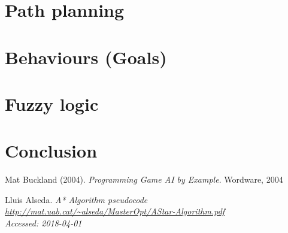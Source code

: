 \documentclass[11pt]{article}
\begin{document}
    \section{Path planning}\label{sec:pathPlanning}
    

    \newpage
    \section{Behaviours (Goals)}\label{sec:behaviour}
    
    
    \newpage
    \section{Fuzzy logic}\label{sec:fuzzyLogic}

    \newpage
    \section{Conclusion}\label{sec:conclusion}
    
    
    \newpage

    \begin{thebibliography}{9}
        Mat Buckland (2004).
        \textit{Programming Game AI by Example}.
        Wordware, 2004

        Lluis Alseda.
        \textit{A* Algorithm pseudocode}
        \\\textit{\url{http://mat.uab.cat/~alseda/MasterOpt/AStar-Algorithm.pdf}}
        \\\textit{Accessed: 2018-04-01}
    \end{thebibliography}
\end{document}
